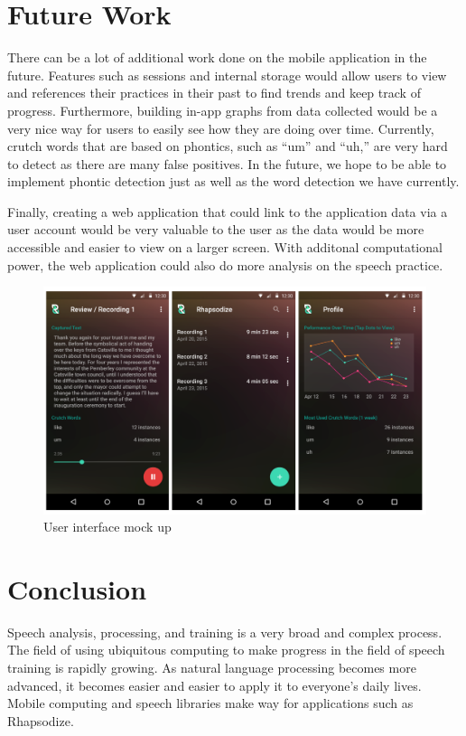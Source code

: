 \documentclass{sigchi}
\begin{document}
\section{Future Work}
There can be a lot of additional work done on the mobile application in the future. Features such as sessions and internal storage would allow users to view and references their practices in their past to find trends and keep track of progress. Furthermore, building in-app graphs from data collected would be a very nice way for users to easily see how they are doing over time. Currently, crutch words that are based on phontics, such as ``um'' and ``uh,'' are very hard to detect as there are many false positives. In the future, we hope to be able to implement phontic detection just as well as the word detection we have currently.

Finally, creating a web application that could link to the application data via a user account would be very valuable to the user as the data would be more accessible and easier to view on a larger screen. With additonal computational power, the web application could also do more analysis on the speech practice.

\begin{figure}[!h]
\centering
\includegraphics[width=0.9\columnwidth]{future}
\caption{User interface mock up
}
\label{fig:figure4}
\end{figure}

\section{Conclusion}

Speech analysis, processing, and training is a very broad and complex process. The field of using ubiquitous computing to make progress in the field of speech training is rapidly growing. As natural language processing becomes more advanced, it becomes easier and easier to apply it to everyone's daily lives. Mobile computing and speech libraries make way for applications such as Rhapsodize. 
\end{document}
